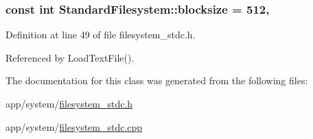 \subsubsection[{\texorpdfstring{blocksize}{blocksize}}]{\setlength{\rightskip}{0pt plus 5cm}const int Standard\+Filesystem\+::blocksize = 512\hspace{0.3cm}{\ttfamily [static]}, {\ttfamily [private]}}\hypertarget{classStandardFilesystem_aa04dcecabc636b2154a0e55847f689f4}{}\label{classStandardFilesystem_aa04dcecabc636b2154a0e55847f689f4}


Definition at line 49 of file filesystem\+\_\+stdc.\+h.



Referenced by Load\+Text\+File().



The documentation for this class was generated from the following files\+:\begin{DoxyCompactItemize}
\item 
app/system/\hyperlink{filesystem__stdc_8h}{filesystem\+\_\+stdc.\+h}\item 
app/system/\hyperlink{filesystem__stdc_8cpp}{filesystem\+\_\+stdc.\+cpp}\end{DoxyCompactItemize}

